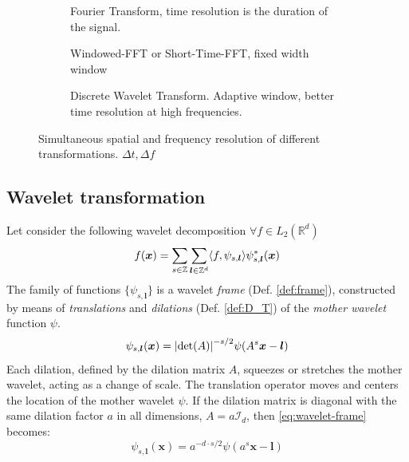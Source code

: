 \begin{figure}[H]
  \begin{subfigure}[t]{.33\textwidth}
    \centering
    
    \captionsetup{width=0.8\textwidth}
    \caption{Fourier Transform, time resolution is the duration of the signal.}
    \label{fig:grid_a_fft}
  \end{subfigure}%
  \begin{subfigure}[t]{.33\textwidth}
    \centering
    
    \captionsetup{width=0.8\textwidth}
    \caption{Windowed-FFT or Short-Time-FFT, fixed width window}
    \label{fig:grid_b_windowed}
  \end{subfigure}%
  \begin{subfigure}[t]{.33\textwidth}
    \centering
    
    \captionsetup{width=0.8\textwidth}
    \caption{Discrete Wavelet Transform. Adaptive window, better time resolution at high frequencies.}
    \label{fig:grid_c_wavelet}
  \end{subfigure}
  \caption{Simultaneous spatial and frequency resolution of different transformations. $\Delta t, \Delta f$}
  \label{fig:grids}
\end{figure}

\subsection{Wavelet transformation}
\label{sub:transform}

Let consider the following wavelet decomposition $\forall f \in L_2(\mathbb{R}^d)$
\begin{equation}
    f(\bm{x}) = \sum_{s \in \mathbb{Z}} \sum_{\bm{l} \in \mathbb{Z}^d} \langle f,\psi_{s,\bm{l}} \rangle \psi^{\ast}_{s,\bm{l}}(\bm{x})
\end{equation}
The family of functions $\{\psi_{s,\bm{l}}\}$ is a wavelet \textit{frame} (Def. \ref{def:frame}), constructed by means of \textit{translations} and \textit{dilations} (Def. \ref{def:D_T}) of the \textit{mother wavelet} function $\psi$.
\begin{equation}
    \psi_{s,\bm{l}}(\bm{x}) = \abs{\det(A)}^{-s/2}\psi(A^s\bm{x} - \bm{l})
\label{eq:wavelet-frame}
\end{equation}
Each dilation, defined by the dilation matrix $A$, squeezes or stretches the mother wavelet, acting as a change of scale. The translation operator moves and centers the location of the mother wavelet $\psi$. If the dilation matrix is diagonal with the same dilation factor $a$ in all dimensions, $A = a \mathcal{I}_d$, then \autoref{eq:wavelet-frame} becomes:
\begin{equation}
    \psi_{s,\bm{l}}(\bm{x}) = a^{-d\cdot s/2}\psi(a^s\bm{x} - \bm{l})
\end{equation}

